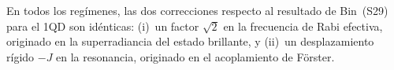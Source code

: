 \documentclass[12pt]{article}
\begin{document}
\noindent
En todos los regímenes, las dos correcciones respecto al resultado de
Bin~(S29) para el 1QD son idénticas: (i)~un factor $\sqrt{2}$ en
la frecuencia de Rabi efectiva, originado en la superradiancia del
estado brillante, y (ii)~un desplazamiento rígido $-J$ en la
resonancia, originado en el acoplamiento de Förster.

	
\end{document}
